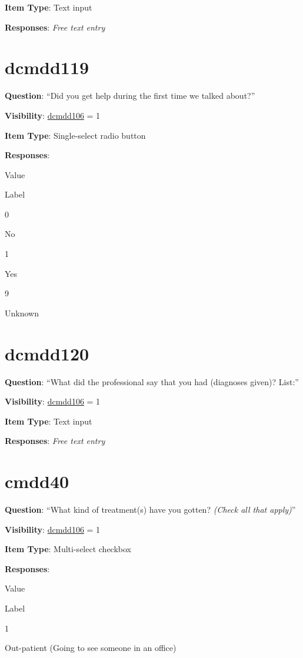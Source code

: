 \documentclass[
]{book}
\begin{document}
\textbf{Item Type}: Text input

\textbf{Responses}: \emph{Free text entry}

\hypertarget{dcmdd119}{%
\section{dcmdd119}\label{dcmdd119}}

\textbf{Question}: ``Did you get help during the first time we talked about?''

\textbf{Visibility}: \protect\hyperlink{dcmdd106}{dcmdd106} = 1

\textbf{Item Type}: Single-select radio button

\textbf{Responses}:

Value

Label

0

No

1

Yes

9

Unknown

\hypertarget{dcmdd120}{%
\section{dcmdd120}\label{dcmdd120}}

\textbf{Question}: ``What did the professional say that you had (diagnoses given)? List:''

\textbf{Visibility}: \protect\hyperlink{dcmdd106}{dcmdd106} = 1

\textbf{Item Type}: Text input

\textbf{Responses}: \emph{Free text entry}

\hypertarget{cmdd40}{%
\section{cmdd40}\label{cmdd40}}

\textbf{Question}: ``What kind of treatment(s) have you gotten? \emph{(Check all that apply)}''

\textbf{Visibility}: \protect\hyperlink{dcmdd106}{dcmdd106} = 1

\textbf{Item Type}: Multi-select checkbox

\textbf{Responses}:

Value

Label

1

Out-patient (Going to see someone in an office)
\end{document}
